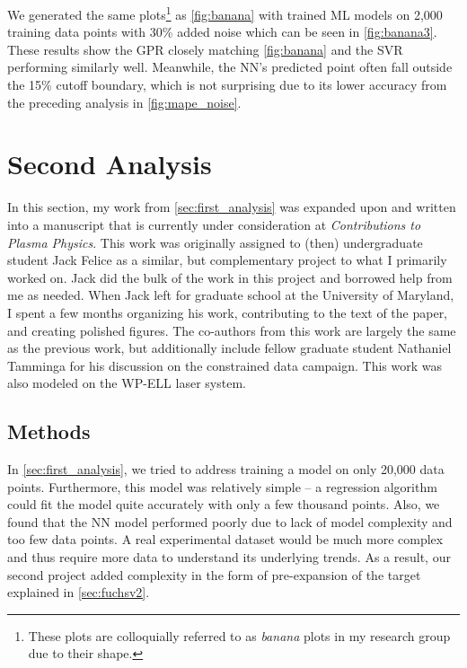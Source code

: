 We generated the same plots\footnote{These plots are colloquially referred to as \emph{banana} plots in my research group due to their shape.} as \autoref{fig:banana} with trained \gls{ML} models on 2,000 training data points with 30\% added noise which can be seen in \autoref{fig:banana3}. These results show the \gls{GPR} closely matching \autoref{fig:banana} and the \gls{SVR} performing similarly well. Meanwhile, the \gls{NN}'s predicted point often fall outside the 15\% cutoff boundary, which is not surprising due to its lower accuracy from the preceding analysis in \autoref{fig:mape_noise}. 

\section{Second Analysis} \label{sec:second_analysis}

In this section, my work from \autoref{sec:first_analysis} was expanded upon and written into a manuscript that is currently under consideration at \emph{Contributions to Plasma Physics}. This work was originally assigned to (then) undergraduate student Jack Felice as a similar, but complementary project to what I primarily worked on. Jack did the bulk of the work in this project and borrowed help from me as needed. When Jack left for graduate school at the University of Maryland, I spent a few months organizing his work, contributing to the text of the paper, and creating polished figures. The co-authors from this work are largely the same as the previous work, but additionally include fellow graduate student Nathaniel Tamminga for his discussion on the constrained data campaign. This work was also modeled on the \gls{WP-ELL} laser system.

\subsection{Methods}
In \autoref{sec:first_analysis}, we tried to address training a model on only 20,000 data points. Furthermore, this model was relatively simple -- a regression algorithm could fit the model quite accurately with only a few thousand points. Also, we found that the \gls{NN} model performed poorly due to lack of model complexity and too few data points. A real experimental dataset would be much more complex and thus require more data to understand its underlying trends. As a result, our second project added complexity in the form of pre-expansion of the target explained in \autoref{sec:fuchsv2}. 

